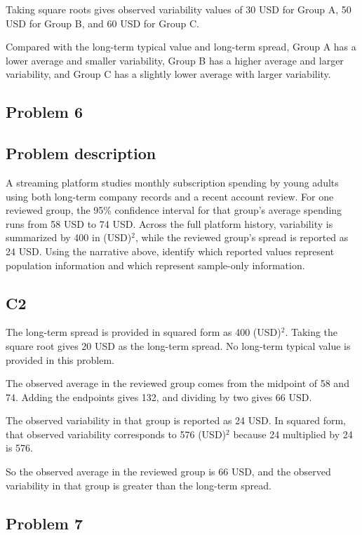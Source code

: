 \begin{ExamProblems}
		Taking square roots gives observed variability values of 30 USD for Group A, 50 USD for Group B, and 60 USD for Group C.

		Compared with the long-term typical value and long-term spread, Group A has a lower average and smaller variability, Group B has a higher average and larger variability, and Group C has a slightly lower average with larger variability.


		\newpage
		\item
		\subsection*{Problem 6}
		\subsection*{Problem description}
		A streaming platform studies monthly subscription spending by young adults using both long-term company records and a recent account review.
		For one reviewed group, the 95\% confidence interval for that group's average spending runs from 58 USD to 74 USD.
		Across the full platform history, variability is summarized by 400 in (USD)$^2$, while the reviewed group's spread is reported as 24 USD.
		Using the narrative above, identify which reported values represent population information and which represent sample-only information.

\subsection*{C2}
		The long-term spread is provided in squared form as 400 (USD)$^2$.
		Taking the square root gives 20 USD as the long-term spread.
		No long-term typical value is provided in this problem.

		The observed average in the reviewed group comes from the midpoint of 58 and 74.
		Adding the endpoints gives 132, and dividing by two gives 66 USD.

		The observed variability in that group is reported as 24 USD.
		In squared form, that observed variability corresponds to 576 (USD)$^2$ because 24 multiplied by 24 is 576.

		So the observed average in the reviewed group is 66 USD, and the observed variability in that group is greater than the long-term spread.


		\newpage
		\item
		\subsection*{Problem 7}

\end{ExamProblems}
